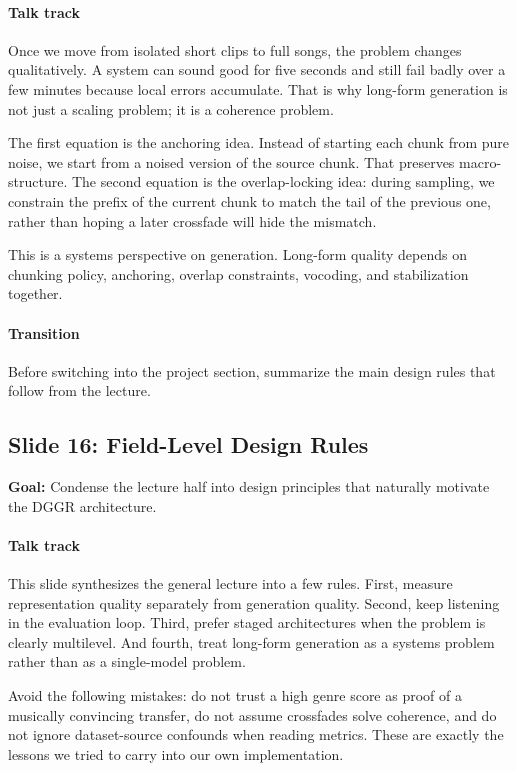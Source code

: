 \documentclass[11pt]{article}
\begin{document}
\paragraph{Talk track}
Once we move from isolated short clips to full songs, the problem changes qualitatively. A system can sound good for five seconds and still fail badly over a few minutes because local errors accumulate. That is why long-form generation is not just a scaling problem; it is a coherence problem.

The first equation is the anchoring idea. Instead of starting each chunk from pure noise, we start from a noised version of the source chunk. That preserves macro-structure. The second equation is the overlap-locking idea: during sampling, we constrain the prefix of the current chunk to match the tail of the previous one, rather than hoping a later crossfade will hide the mismatch.

This is a systems perspective on generation. Long-form quality depends on chunking policy, anchoring, overlap constraints, vocoding, and stabilization together.

\paragraph{Transition}
Before switching into the project section, summarize the main design rules that follow from the lecture.

\subsection*{Slide 16: Field-Level Design Rules}
\textbf{Goal:} Condense the lecture half into design principles that naturally motivate the DGGR architecture.
\paragraph{Talk track}
This slide synthesizes the general lecture into a few rules. First, measure representation quality separately from generation quality. Second, keep listening in the evaluation loop. Third, prefer staged architectures when the problem is clearly multilevel. And fourth, treat long-form generation as a systems problem rather than as a single-model problem.

Avoid the following mistakes: do not trust a high genre score as proof of a musically convincing transfer, do not assume crossfades solve coherence, and do not ignore dataset-source confounds when reading metrics. These are exactly the lessons we tried to carry into our own implementation.
\end{document}
